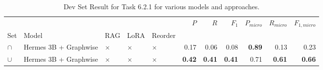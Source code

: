 \begin{table}
\caption{Dev Set Result for Task 6.2.1 for various models and approaches.}
\label{tab:task:6_2_1:test:ontug}
\begin{tabular}{lllllrrrrrr}
\toprule
 &  &  &  &  & $P$ & $R$ & $F_1$ & $P_{micro}$ & $R_{micro}$ & $F_{1,micro}$ \\
Set & Model & RAG & LoRA & Reorder &  &  &  &  &  &  \\
\midrule
$\cap$ & Hermes 3B + Graphwise & $\times$ & $\times$ & $\times$ & 0.17 & 0.06 & 0.08 & \textbf{0.89} & 0.13 & 0.23 \\
\cline{1-11} \cline{2-11} \cline{3-11} \cline{4-11} \cline{5-11}
$\cup$ & Hermes 3B + Graphwise & $\times$ & $\times$ & $\times$ & \textbf{0.42} & \textbf{0.41} & \textbf{0.41} & 0.71 & \textbf{0.61} & \textbf{0.66} \\
\cline{1-11} \cline{2-11} \cline{3-11} \cline{4-11} \cline{5-11}
\bottomrule
\end{tabular}
\end{table}
